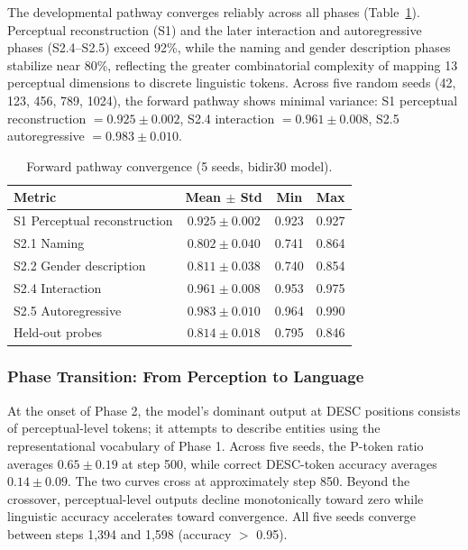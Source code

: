 \documentclass{article}
\begin{document}
The developmental pathway converges reliably across all phases (Table~\ref{tab:forward}). Perceptual reconstruction (S1) and the later interaction and autoregressive phases (S2.4--S2.5) exceed 92\%, while the naming and gender description phases stabilize near 80\%, reflecting the greater combinatorial complexity of mapping 13 perceptual dimensions to discrete linguistic tokens. Across five random seeds (42, 123, 456, 789, 1024), the forward pathway shows minimal variance: S1 perceptual reconstruction $= 0.925 \pm 0.002$, S2.4 interaction $= 0.961 \pm 0.008$, S2.5 autoregressive $= 0.983 \pm 0.010$.

\begin{table}[htbp]
\centering
\small
\begin{tabular}{lccc}
\toprule
Metric & Mean $\pm$ Std & Min & Max \\
\midrule
S1 Perceptual reconstruction & $0.925 \pm 0.002$ & 0.923 & 0.927 \\
S2.1 Naming & $0.802 \pm 0.040$ & 0.741 & 0.864 \\
S2.2 Gender description & $0.811 \pm 0.038$ & 0.740 & 0.854 \\
S2.4 Interaction & $0.961 \pm 0.008$ & 0.953 & 0.975 \\
S2.5 Autoregressive & $0.983 \pm 0.010$ & 0.964 & 0.990 \\
Held-out probes & $0.814 \pm 0.018$ & 0.795 & 0.846 \\
\bottomrule
\end{tabular}
\caption{Forward pathway convergence (5 seeds, bidir30 model).}
\label{tab:forward}
\end{table}

\subsubsection{Phase Transition: From Perception to Language}

At the onset of Phase 2, the model's dominant output at DESC positions consists of perceptual-level tokens; it attempts to describe entities using the representational vocabulary of Phase 1. Across five seeds, the P-token ratio averages $0.65 \pm 0.19$ at step 500, while correct DESC-token accuracy averages $0.14 \pm 0.09$. The two curves cross at approximately step 850. Beyond the crossover, perceptual-level outputs decline monotonically toward zero while linguistic accuracy accelerates toward convergence. All five seeds converge between steps 1,394 and 1,598 (accuracy $>$ 0.95).
\end{document}

